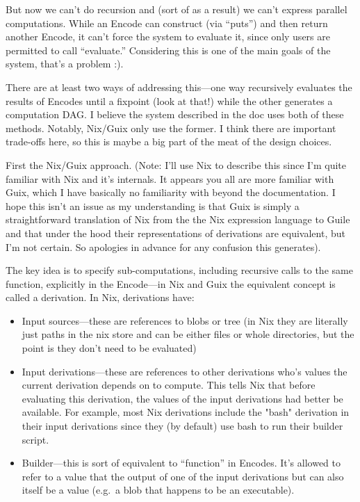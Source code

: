 \documentclass{article}
\newcommand{\bs}{\vspace{\baselineskip}}
\begin{document}
But now we can't do recursion and (sort of as a result) we can't
express parallel computations. While an Encode can construct (via
``puts'') and then return another Encode, it can't force the system to
evaluate it, since only users are permitted to call ``evaluate.''
Considering this is one of the main goals of the system, that's a
problem :).

\bs

There are at least two ways of addressing this---one way recursively
evaluates the results of Encodes until a fixpoint (look at that!)
while the other generates a computation DAG. I believe the system
described in the doc uses both of these methods. Notably, Nix/Guix
only use the former. I think there are important trade-offs here, so
this is maybe a big part of the meat of the design choices.

\bs

First the Nix/Guix approach. (Note: I'll use Nix to describe this
since I'm quite familiar with Nix and it's internals. It appears you
all are more familiar with Guix, which I have basically no familiarity
with beyond the documentation. I hope this isn't an issue as my
understanding is that Guix is simply a straightforward translation of
Nix from the the Nix expression language to Guile and that under the
hood their representations of derivations are equivalent, but I'm not
certain. So apologies in advance for any confusion this generates).

\bs

The key idea is to specify sub-computations, including recursive calls
to the same function, explicitly in the Encode---in Nix and Guix the
equivalent concept is called a derivation. In Nix, derivations have:

\begin{itemize}

\item    Input sources---these are references to blobs or tree (in Nix they are literally just paths in the nix store and can be either files or whole directories, but the point is they don't need to be evaluated)
\item Input derivations---these are references to other derivations who's values the current derivation depends on to compute. This tells Nix that before evaluating this derivation, the values of the input derivations had better be available. For example, most Nix derivations include the "bash" derivation in their input derivations since they (by default) use bash to run their builder script.
\item    Builder---this is sort of equivalent to ``function'' in Encodes. It's allowed to refer to a value that the output of one of the input derivations but can also itself be a value (e.g.~a blob that happens to be an executable).
\end{itemize}
\end{document}
